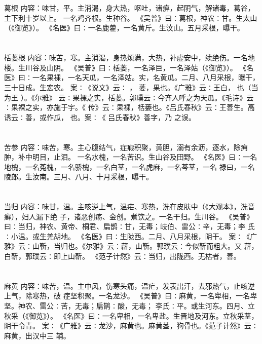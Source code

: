 \documentclass[12pt,UTF8]{ctexbook}
\begin{document}
\chapter{}葛根
内容：味甘，平。主消渴，身大热，呕吐，诸痹，起阴气，解诸毒，葛谷，主下利十岁以上。 
一名鸡齐根。生种谷。 
《吴普》曰∶葛根，神农∶甘。生太山（《御览》）。 
《名医》曰∶一名鹿藿，一名黄斤。生汶山。五月采根，曝干。 


\chapter{}栝蒌根
内容：味苦，寒。主消渴，身热烦满，大热，补虚安中，续绝伤。一名地楼。生川谷及山阴。 
《吴普》曰∶栝蒌，一名泽巨，一名泽姑（《御览》）。 
《名医》曰∶一名果裸，一名天瓜，一名泽姑。实，名黄瓜。二月、八月采根，曝干， 
三十日成。生宏农。 
案∶《说文》云∶ ， 蒌，果也。《广雅》云∶王白， 也（当为王 ）。《尔雅》 
云∶果裸之实，栝蒌。郭璞云∶今齐人呼之为天瓜。《毛诗》云∶果裸之实，亦施于宇。《 
传》云∶果裸，栝蒌也。《吕氏春秋》云∶王善生。高诱云∶善，或作瓜， 也。案∶《 
吕氏春秋》善字，乃 之误。 


\chapter{}苦参
内容：味苦，寒。主心腹结气，症瘕积聚，黄胆，溺有余沥，逐水，除痈肿，补中明目，止泪。 
一名水槐，一名苦识。生山谷及田野。 
《名医》曰∶一名地槐，一名菟槐，一名骄槐，一名白茎，一名虎麻，一名芩茎，一名 
禄曰，一名陵郎。生汝南。三月、八月、十月采根，曝干。 


\chapter{}当归
内容：味甘，温。主咳逆上气，温疟、寒热，洗在皮肤中（《大观本》，洗音癣），妇人漏下绝 
子，诸恶创疡、金创。煮饮之。一名干归。生川谷。 
《吴普》曰∶当归，神农、黄帝、桐君、扁鹊∶甘，无毒；岐伯、雷公∶辛，无毒；李 
氏∶小温。或生羌胡地。 
《名医》曰∶生陇西。二月、八月采根，阴干。 
案∶《广雅》云∶山靳，当归也。《尔雅》云∶薜，山靳。郭璞云∶今似靳而粗大。又 
薜，白靳，郭璞云∶即上山靳。 
《范子计然》云∶当归，出陇西。无枯者，善。 


\chapter{}麻黄
内容：味苦，温。主中风，伤寒头痛，温疟，发表出汗，去邪热气，止咳逆上气，除寒热，破 
症坚积聚。一名龙沙。 
《吴普》曰∶麻黄，一名卑相，一名卑坚。神农、雷公∶苦，无毒；扁鹊∶酸，无毒； 
李氏∶平。或生河东。四月、立秋采（《御览》）。 
《名医》曰∶一名卑相，一名卑盐。生晋地及河东。立秋采茎，阴干令青。 
案∶《广雅》云∶龙沙，麻黄也。麻黄茎，狗骨也。《范子计然》云∶麻黄，出汉中三 
辅。 
\end{document}
